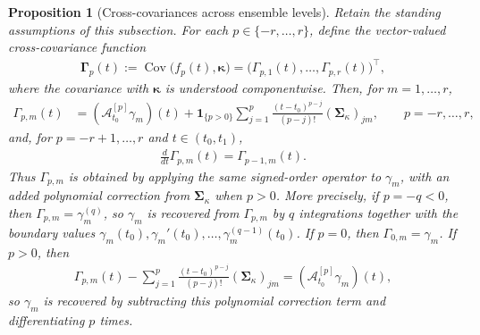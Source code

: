 \documentclass[11pt,a4paper]{article}
\newtheorem{proposition}{Proposition}
\theoremstyle{definition}
\theoremstyle{remark}
\DeclareMathOperator{\Cov}{Cov}
\begin{document}
\begin{proposition}[Cross-covariances across ensemble levels]\label{prop:appendix-cross-chain}
Retain the standing assumptions of this subsection. For each \(p\in\{-r,\ldots,r\}\), define the vector-valued cross-covariance function
\begin{align*}
\boldsymbol{\Gamma}_p(t):=\Cov\bigl(f_p(t),\boldsymbol{\kappa}\bigr)
=\bigl(\Gamma_{p,1}(t),\ldots,\Gamma_{p,r}(t)\bigr)^\top,
\end{align*}
where the covariance with \(\boldsymbol{\kappa}\) is understood componentwise. Then, for \(m=1,\ldots,r\),
\begin{align*}
\Gamma_{p,m}(t)
&=(\mathcal A_{t_0}^{[p]}\gamma_m)(t)+\mathbf{1}_{\{p>0\}}\sum_{j=1}^{p}\frac{(t-t_0)^{p-j}}{(p-j)!}(\boldsymbol{\Sigma}_{\kappa})_{jm},
\qquad p=-r,\ldots,r,
\end{align*}
and, for \(p=-r+1,\ldots,r\) and \(t\in(t_0,t_1)\),
\begin{align*}
\frac{d}{dt}\Gamma_{p,m}(t)=\Gamma_{p-1,m}(t).
\end{align*}
Thus \(\Gamma_{p,m}\) is obtained by applying the same signed-order operator to \(\gamma_m\), with an added polynomial correction from \(\boldsymbol{\Sigma}_{\kappa}\) when \(p>0\). More precisely, if \(p=-q<0\), then \(\Gamma_{p,m}=\gamma_m^{(q)}\), so \(\gamma_m\) is recovered from \(\Gamma_{p,m}\) by \(q\) integrations together with the boundary values \(\gamma_m(t_0),\gamma_m'(t_0),\ldots,\gamma_m^{(q-1)}(t_0)\). If \(p=0\), then \(\Gamma_{0,m}=\gamma_m\). If \(p>0\), then
\begin{align*}
\Gamma_{p,m}(t)-\sum_{j=1}^{p}\frac{(t-t_0)^{p-j}}{(p-j)!}(\boldsymbol{\Sigma}_{\kappa})_{jm}
=(\mathcal A_{t_0}^{[p]}\gamma_m)(t),
\end{align*}
so \(\gamma_m\) is recovered by subtracting this polynomial correction term and differentiating \(p\) times.
\end{proposition}
\end{document}

